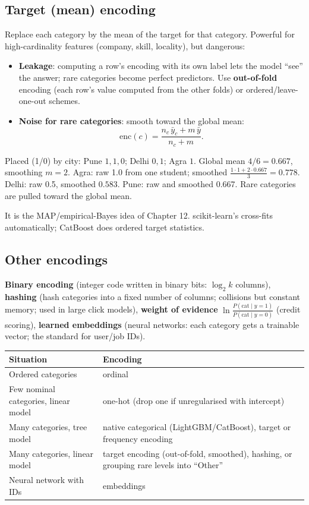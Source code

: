 \subsection{Target (mean) encoding}
Replace each category by the mean of the target for that category. Powerful for high-cardinality features (company, skill, locality), but dangerous:
\begin{itemize}
\item \textbf{Leakage}: computing a row's encoding with its own label lets the model ``see'' the answer; rare categories become perfect predictors. Use \textbf{out-of-fold}
  encoding (each row's value computed from the other folds) or ordered/leave-one-out schemes.
\item \textbf{Noise for rare categories}: smooth toward the global mean:
  \[ \text{enc}(c) = \frac{n_c\,\bar y_c + m\,\bar y}{n_c + m}. \]
\end{itemize}
\begin{example}
Placed (1/0) by city: Pune $1,1,0$; Delhi $0,1$; Agra $1$. Global mean $4/6 = 0.667$, smoothing $m = 2$. Agra: raw 1.0 from one student; smoothed $\frac{1\cdot1 + 2\cdot0.667}{3}
= 0.778$. Delhi: raw 0.5, smoothed $0.583$. Pune: raw and smoothed 0.667. Rare categories are pulled toward the global mean.
\end{example}
It is the MAP/empirical-Bayes idea of Chapter 12. scikit-learn's  cross-fits automatically; CatBoost does ordered target statistics.

\subsection{Other encodings}
\textbf{Binary encoding} (integer code written in binary bits: $\log_2k$ columns), \textbf{hashing} (hash categories into a fixed number of columns; collisions but constant memory;
used in large click models), \textbf{weight of evidence} $\ln\frac{P(\text{cat}\mid y=1)}{P(\text{cat}\mid y=0)}$ (credit scoring), \textbf{learned embeddings} (neural networks: each
category gets a trainable vector; the standard for user/job IDs).

\begin{center}\small
\begin{tabularx}{\linewidth}{l X}
\toprule
Situation & Encoding\\
\midrule
Ordered categories & ordinal\\
Few nominal categories, linear model & one-hot (drop one if unregularised with intercept)\\
Many categories, tree model & native categorical (LightGBM/CatBoost), target or frequency encoding\\
Many categories, linear model & target encoding (out-of-fold, smoothed), hashing, or grouping rare levels into ``Other''\\
Neural network with IDs & embeddings\\
\bottomrule
\end{tabularx}
\end{center}

